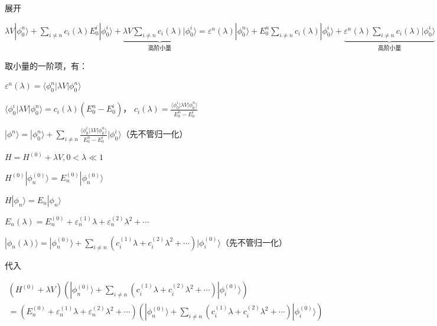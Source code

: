 展开

$\lambda V|\phi_0^n\rangle+\sum_{i\neq n}c_i(\lambda)E_0^i|\phi_0^i\rangle+ \underbrace{\lambda V\sum_{i\neq n}c_i(\lambda)|\phi_0^i\rangle}_{\text{高阶小量}} = \varepsilon^n(\lambda)|\phi_0^n\rangle+E_0^n\sum_{i\neq n}c_i(\lambda)|\phi_0^i\rangle + \underbrace{\varepsilon^n(\lambda)\sum_{i\neq n}c_i(\lambda)|\phi_0^i\rangle}_{\text{高阶小量}}$

\bigskip

取小量的一阶项，有：

$\varepsilon^n(\lambda)=\langle\phi_0^n|\lambda V|\phi_0^n\rangle$

$\langle\phi_0^i|\lambda V|\phi_0^n\rangle=c_i(\lambda)(E_0^n-E_0^i)$，
$c_i(\lambda)=\frac{\langle\phi_0^i|\lambda V|\phi_0^n\rangle}{E_0^n-E_0^i}$

$|\phi^n\rangle=|\phi_0^n\rangle+\sum_{i\neq n}\frac{\langle\phi_0^i|\lambda V|\phi_0^n\rangle}{E_0^n-E_0^i}|\phi_0^i\rangle$（先不管归一化）

\bigskip
\bigskip
\bigskip

$H=H^{(0)}+\lambda V, 0<\lambda\ll 1$

$H^{(0)}|\phi^{(0)}_n\rangle=E^{(0)}_n|\phi^{(0)}_n\rangle$

$H|\phi_n\rangle=E_n|\phi_n\rangle$

\bigskip

$E_n(\lambda)=E^{(0)}_n+\varepsilon^{(1)}_n\lambda+\varepsilon^{(2)}_n\lambda^2+\cdots$

$|\phi_n(\lambda)\rangle=|\phi^{(0)}_n\rangle+\sum_{i\neq n}(c^{(1)}_i\lambda+c^{(2)}_i\lambda^2+\cdots)|\phi^{(0)}_i\rangle$（先不管归一化）

\bigskip

代入

\begin{equation}
    \begin{split}
    (H^{(0)}+\lambda V)(|\phi^{(0)}_n\rangle+\sum_{i\neq n}(c^{(1)}_i\lambda+c^{(2)}_i\lambda^2+\cdots)|\phi^{(0)}_i\rangle)\\
    =(E^{(0)}_n+\varepsilon^{(1)}_n\lambda+\varepsilon^{(2)}_n\lambda^2+\cdots)(|\phi^{(0)}_n\rangle+\sum_{i\neq n}(c^{(1)}_i\lambda+c^{(2)}_i\lambda^2+\cdots)|\phi^{(0)}_i\rangle)
    \end{split}
\end{equation}

